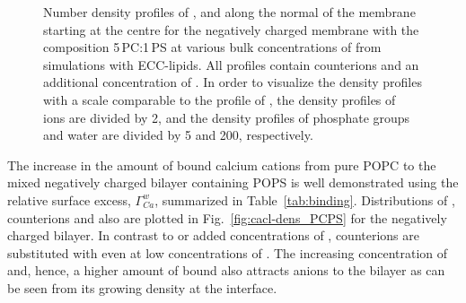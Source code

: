 \documentclass[journal=jpcbfk,manuscript=article]{achemso}
\begin{document}
\begin{figure}[htbp!]
{    Number density profiles of ,  and  along the normal of the membrane starting at the centre
    for the negatively charged membrane with the composition 5\,PC:1\,PS
    at various bulk concentrations of  from simulations with ECC-lipids. 
    All profiles contain  counterions and an additional concentration of . 
    In order to visualize the density profiles with a scale comparable to the profile of ,  
    the density profiles of~ ions are divided by 2, and 
    the density profiles of phosphate groups and water are divided by 5 and 200, respectively.  
    } 
\end{figure} 
 





The increase in the amount of bound calcium cations from pure POPC \cite{melcr18}
to the mixed negatively charged bilayer containing POPS
is well demonstrated using the relative surface excess, $\Gamma ^w _{Ca}$,
summarized in Table~\ref{tab:binding}. 
Distributions of ,  counterions and also  
are plotted in Fig.~\ref{fig:cacl-dens_PCPS} for the negatively charged bilayer. 
In contrast to  or added concentrations of , 
 counterions are substituted with  even at low concentrations of . 
The increasing concentration of  and, hence, a higher amount of bound 
also attracts  anions to the bilayer 
as can be seen from its growing density at the interface. 
\end{document}
